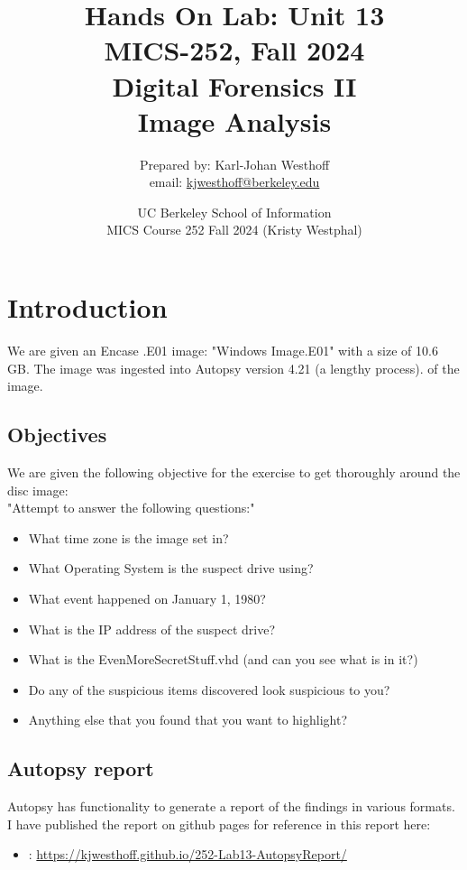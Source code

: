 \documentclass[
	letterpaper, %
	10pt, %
	unnumberedsections, %
	twoside, %
]{APAAssignment}
\title{Hands On Lab: Unit 13 \\ MICS-252, Fall 2024 \\ Digital Forensics II \\ Image Analysis}
\date{UC Berkeley School of Information \\
MICS Course 252 Fall 2024 (Kristy Westphal)
}
\author{
	Prepared by: Karl-Johan Westhoff \\
	email: \href{mailto:kjwesthoff@berkeley.edu}{kjwesthoff@berkeley.edu}
}
\begin{document}
\onecolumn
\maketitle %


\section{Introduction}
We are given an Encase .E01 image: "Windows Image.E01" with a size of 10.6 GB. The image was ingested into Autopsy version 4.21 (a lengthy process).
of the image.

\subsection{Objectives}
We are given the following objective for the exercise to get thoroughly around the disc image: \\
"Attempt to answer the following questions:"
\begin{itemize}
	\item What time zone is the image set in?
	\item What Operating System is the suspect drive using?
	\item What event happened on January 1, 1980?
	\item What is the IP address of the suspect drive?
	\item What is the EvenMoreSecretStuff.vhd (and can you see what is in it?)
	\item Do any of the suspicious items discovered look suspicious to you?
	\item Anything else that you found that you want to highlight?
\end{itemize}

\subsection{Autopsy report}
Autopsy has functionality to generate a report of the findings in various formats. I have published the report on github pages for reference in this report here:
\begin{itemize}
	\item	\cite{AutoReport}: \url{https://kjwesthoff.github.io/252-Lab13-AutopsyReport/}
\end{itemize}
\end{document}
